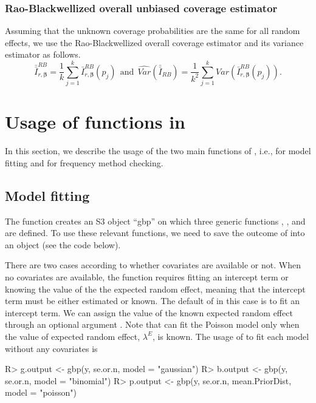 \documentclass[article]{jss}
\begin{document}
\subsubsection{Rao-Blackwellized overall unbiased coverage estimator}\label{overallRB} Assuming that the unknown  coverage probabilities are the same for all random effects, we use the Rao-Blackwellized overall coverage estimator and its variance estimator as follows.
\begin{equation}\label{RBoverall}
\bar{\bar{I}}^{RB}_{r, \boldsymbol{\beta}} = \frac{1}{k}\sum_{j=1}^k\bar{I}^{RB}_{r, \boldsymbol{\beta}}(p_j)~~\textrm{and}~~ \widehat{Var}(\bar{\bar{I}}_{RB})=\frac{1}{k^2}\sum_{j=1}^k\widehat{Var}(\bar{I}^{RB}_{r, \boldsymbol{\beta}}(p_j)).
\end{equation}


\section[packageoverview]{Usage of functions in }\label{sec5}
In this section, we describe the usage of the two main functions of , i.e.,  for model fitting and  for frequency method checking. 

\subsection{Model fitting}
The function  creates an S3 object ``gbp'' on which  three generic functions , , and  are defined. To use these relevant functions, we need to save the outcome of  into an object (see the code below).

There are two cases according to whether covariates are available or not. When no covariates are available, the function  requires fitting an intercept term  or knowing the value of the  the expected random effect, meaning that the intercept term must be either estimated or known. The default of  in this case is to fit an intercept term. We can assign the value of the known expected random effect through an optional argument . Note that  can fit the Poisson model only when the value of expected random effect, $\lambda^E$, is known. The usage of  to  fit each model without any covariates is 
\begin{CodeChunk}
\begin{CodeInput}
R> g.output <- gbp(y, se.or.n, model = "gaussian")
R> b.output <- gbp(y, se.or.n, model = "binomial")
R> p.output <- gbp(y, se.or.n, mean.PriorDist, model = "poisson")
\end{CodeInput}
\end{CodeChunk}
\end{document}

